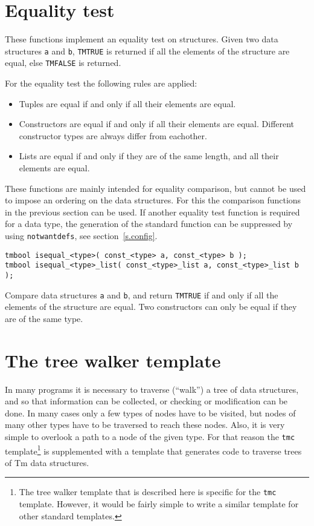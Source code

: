 \section{Equality test}
These functions implement an equality test on structures.
Given two data structures \texttt{a} and \texttt{b},
\texttt{TMTRUE} is returned if all the elements of the structure are equal,
else \texttt{TMFALSE} is returned.
\par
For the equality test the following rules are applied:
\begin{itemize}
\item
Tuples are equal if and only if all their elements are equal.
\item
Constructors are equal if and only if all their elements are equal.
Different constructor types are always differ from eachother.
\item
Lists are equal if and only if they are of the same length, and all their elements are equal.
\end{itemize}
\par
These functions are mainly intended for equality comparison,
but cannot be used to impose an ordering on the data structures.
For this the comparison functions in the previous section can be used.
If another equality test function is required for a data type,
the generation of the standard function can be suppressed by
using \texttt{notwantdefs}, see section~\ref{s.config}.
\begin{verbatim}
tmbool isequal_<type>( const_<type> a, const_<type> b );
tmbool isequal_<type>_list( const_<type>_list a, const_<type>_list b );
\end{verbatim}
\begin{desc}
Compare data structures \texttt{a} and \texttt{b}, and return \texttt{TMTRUE}
if and only if all the elements of the structure are equal.
Two constructors can only be equal if they are of the same type.
\end{desc}
\section{The tree walker template}
\label{s.treewalk}
In many programs it is necessary to traverse (``walk'') a tree of
data structures, and so that information can be collected, or checking
or modification can be done. In many cases only a few types of nodes
have to be visited, but nodes of many other types have to be traversed
to reach these nodes. Also, it is very simple to overlook a path to a node
of the given type. For that reason the \verb'tmc' template\footnote{The
tree walker template that is described here is specific for the \texttt{tmc}
template. However, it would be fairly simple to write a similar template
for other standard templates.} is supplemented with a template that
generates code to traverse trees of Tm data structures.

